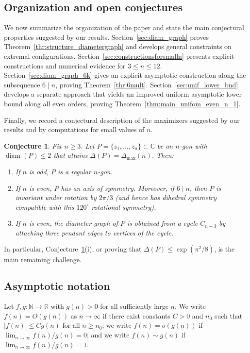 \documentclass{article}
\DeclareMathOperator{\diam}{diam}
\newtheorem{conj}[thr]{Conjecture}
\theoremstyle{definition}
\newcommand{\C}{\mathbb{C}}
\let\le\leqslant
\let\ge\geqslant
\newcommand*{\oD}{\overline \Delta}
\begin{document}
\subsection{Organization and open conjectures}



We now summarize the organization of the paper and state the main conjectural properties suggested by our results.
Section~\ref{sec:diam_graph} proves Theorem~\ref{thr:structure_diametergraph} and develops general constraints on extremal configurations.
Section~\ref{sec:constructionsforsmalln} presents explicit constructions and numerical evidence for $3\le n\le 12$.
Section~\ref{sec:diam_graph_6k} gives an explicit asymptotic construction along the subsequence $6\mid n$, proving Theorem~\ref{thr:6mult}.
Section~\ref{sec:unif_lower_bnd} develops a separate approach that yields an improved uniform asymptotic lower bound along all even orders, proving Theorem~\ref{thm:main_unifom_even_n_1}.






Finally, we record a conjectural description of the maximizers suggested by our results and by computations for small values of $n$.

\begin{conj}\label{conj:extrpolygonproperties}
Fix $n\ge 3$. Let $P=\{z_1,\dots,z_n\}\subset\C$ be an $n$-gon with $\diam(P)\le 2$ that attains
$\Delta(P)=\Delta_{\max}(n)$.
Then:
\begin{enumerate}
    \item[(i)] If $n$ is odd, $P$ is a regular $n$-gon.
    \item[(ii)] If $n$ is even, $P$ has an axis of symmetry. Moreover, if $6\mid n$, then $P$ is invariant under rotation by $2\pi/3$
    (and hence has dihedral symmetry compatible with this $120^\circ$ rotational symmetry).
    \item[(iii)] If $n$ is even, the diameter graph of $P$ is obtained from a cycle $C_{n-3}$ by attaching three pendant edges to vertices of the cycle.
\end{enumerate}
\end{conj}


In particular, Conjecture~\ref{conj:extrpolygonproperties}(i), or proving that $\oD(P) \le \exp( \pi^2/8)$, is the main remaining challenge.


\subsection{Asymptotic notation}
Let $f,g:\mathbb{N}\to\mathbb{R}$ with $g(n)>0$ for all sufficiently large $n$. 
We write $f(n)=O(g(n))$ as $n\to\infty$ if there exist constants $C>0$ and $n_0$ such that $|f(n)|\le Cg(n)$ for all $n\ge n_0$; 
we write $f(n)=o(g(n))$ if $\lim_{n\to\infty} f(n)/g(n)=0$; 
and we write $f(n)\sim g(n)$ if $\lim_{n\to\infty} f(n)/g(n)=1$.
\end{document}
